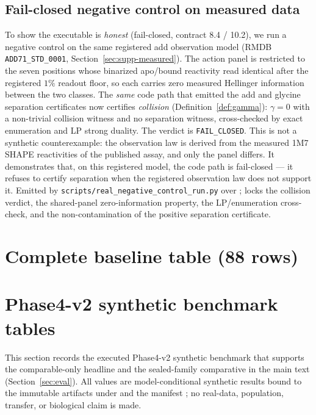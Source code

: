 \documentclass[11pt]{article}
\begin{document}
\subsection{Fail-closed negative control on measured data}\label{sec:supp-measured-negative}
To show the executable is \emph{honest} (fail-closed, contract 8.4 / 10.2), we run a negative control on
the same registered add observation model (RMDB \texttt{ADD71\_STD\_0001},
Section~\ref{sec:supp-measured}). The action panel is restricted to the seven positions whose binarized
apo/bound reactivity read identical after the registered $1\%$ readout floor, so each carries zero
measured Hellinger information between the two classes. The \emph{same} code path that emitted the add
and glycine separation certificates now certifies \emph{collision} (Definition~\ref{def:gamma}):
$\gamma=0$ with a non-trivial collision witness and no separation witness, cross-checked by exact
enumeration and LP strong duality. The verdict is \texttt{FAIL\_CLOSED}. This is not a synthetic
counterexample: the observation law is derived from the measured 1M7 SHAPE reactivities of the published
assay, and only the panel differs. It demonstrates that, on this registered model, the code path is
fail-closed --- it refuses to certify separation when the registered observation law does not support it.
Emitted by
\texttt{scripts/real\_negative\_control\_run.py} over
\texttt{};
\texttt{} locks the collision verdict, the shared-panel
zero-information property, the LP/enumeration cross-check, and the non-contamination of the positive
separation certificate.

\section{Complete baseline table (88 rows)}\label{sec:supp88}


\section{Phase4-v2 synthetic benchmark tables}\label{sec:supp-benchmark}

This section records the executed Phase4-v2 synthetic benchmark that supports the comparable-only
headline and the sealed-family comparative in the main text
(Section~\ref{sec:eval}). All values are model-conditional synthetic results bound to the immutable
artifacts under \texttt{} and the manifest
\texttt{}; no real-data, population, transfer, or
biological claim is made.
\end{document}
